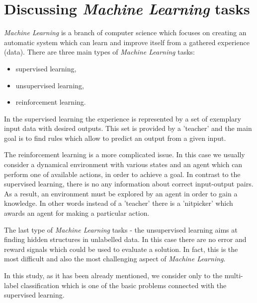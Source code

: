 \section{Discussing \textit{Machine Learning} tasks}

\textit{Machine Learning} is a branch of computer science which focuses on creating an automatic system which can learn and improve itself from a gathered experience (data). There are three main types of \textit{Machine Learning} tasks:

\begin{itemize}
\item supervised learning,
\item unsupervised learning,
\item reinforcement learning.
\end{itemize}

In the supervised learning the experience is represented by a set of exemplary input data with desired outputs. This set is provided by a 'teacher' and the main goal is to find rules which allow to predict an output from a given input.

The reinforcement learning is a more complicated issue. In this case we usually consider a dynamical environment with various states and an agent which can perform one of available actions, in order to achieve a goal. In contrast to the supervised learning, there is no any information about correct input-output pairs. As a result, an environment must be explored by an agent in order to gain a knowledge. In other words instead of a 'teacher' there is a 'nitpicker' which awards an agent for making a particular action. 

The last type of \textit{Machine Learning} tasks - the unsupervised learning aims at finding hidden structures in unlabelled data. In this case there are no error and reward signals which could be used to evaluate a solution. In fact, this is the most difficult and also the most challenging aspect of \textit{Machine Learning}. 

In this study, as it has been already mentioned, we consider only to the multi-label classification which is one of the basic problems connected with the supervised learning. 

